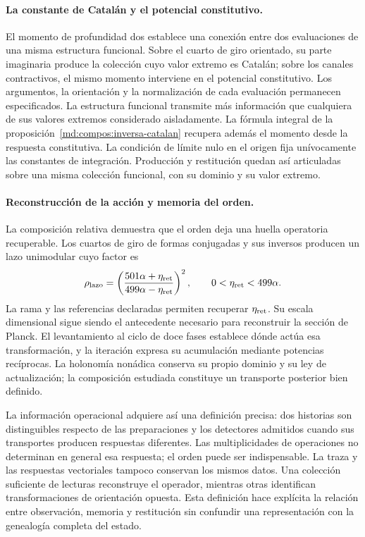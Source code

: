 \paragraph{La constante de Catalán y el potencial constitutivo.}
El momento de profundidad dos establece una conexión entre dos evaluaciones
de una misma estructura funcional. Sobre el
cuarto de giro orientado, su parte imaginaria produce la colección cuyo
valor extremo es Catalán; sobre los canales contractivos, el mismo
momento interviene en el potencial constitutivo. Los argumentos, la
orientación y la normalización de cada evaluación permanecen especificados.
La estructura funcional transmite más información que cualquiera de sus
valores extremos considerado aisladamente.
La fórmula integral de la proposición~\ref{md:compos:inversa-catalan}
recupera además el momento desde la respuesta constitutiva. La condición
de límite nulo en el origen fija unívocamente las constantes de integración.
Producción y restitución quedan así articuladas sobre una misma colección
funcional, con su dominio y su valor extremo.

\newpage
\paragraph{Reconstrucción de la acción y memoria del orden.}
La composición relativa demuestra que el orden deja
una huella operatoria recuperable. Los cuartos de giro de formas
conjugadas y sus inversos producen un lazo unimodular cuyo factor es
\[
 \rho_{\rm lazo}=
 \left(\frac{501\alpha+\eta_{\rm ret}}
 {499\alpha-\eta_{\rm ret}}\right)^2,
 \qquad 0<\eta_{\rm ret}<499\alpha.
\]
La rama y las referencias declaradas permiten recuperar
\(\eta_{\rm ret}\). Su escala dimensional sigue siendo el antecedente
necesario para reconstruir la sección de Planck. El levantamiento al
ciclo de doce fases establece dónde actúa esa transformación, y la
iteración expresa su acumulación mediante potencias recíprocas. La
holonomía nonádica conserva su propio dominio y su ley de actualización;
la composición estudiada constituye un transporte posterior bien definido.

La información operacional adquiere así una definición precisa: dos
historias son distinguibles respecto de las preparaciones y los
detectores admitidos cuando sus transportes producen respuestas
diferentes. Las multiplicidades de operaciones no determinan en general
esa respuesta; el orden puede ser indispensable. La traza y las respuestas
vectoriales tampoco conservan los mismos datos. Una colección suficiente
de lecturas reconstruye el operador, mientras otras identifican
transformaciones de orientación opuesta. Esta definición hace explícita
la relación entre observación, memoria y restitución sin confundir una
representación con la genealogía completa del estado.

